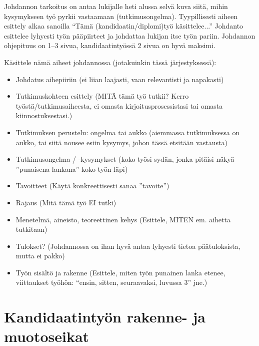 Johdannon tarkoitus on antaa lukijalle heti alussa selvä kuva siitä,
mihin kysymykseen työ pyrkii vastaamaan
(tutkimusongelma). Tyypillisesti aiheen esittely alkaa sanoilla ``Tämä
(kandidaatin/diplomi)työ käsittelee...''  Johdanto esittelee lyhyesti
työn pääpiirteet ja johdattaa lukijan itse työn pariin. Johdannon
ohjepituus on 1--3 sivua, kandidaatintyössä 2 sivua on hyvä maksimi.

Käsittele nämä aiheet johdannossa (jotakuinkin tässä järjestyksessä):
%
\begin{itemize}
 \item Johdatus aihepiiriin 
(ei liian laajasti, vaan relevantisti ja napakasti)
%
 \item Tutkimuskohteen esittely (MITÄ tämä työ tutkii? 
Kerro työstä/tutkimusaiheesta, ei omasta kirjoitusprosessistasi 
tai omasta kiinnostuksestasi.)
%
 \item Tutkimuksen perustelu: ongelma tai aukko 
(aiemmassa tutkimuksessa on aukko, tai siitä nousee esiin 
kysymys, johon tässä etsitään vastausta)
%
 \item Tutkimusongelma / -kysymykset (koko työsi sydän, 
jonka pitäisi näkyä ''punaisena lankana'' koko työn läpi)
 \item Tavoitteet (Käytä konkreettisesti sanaa ''tavoite'')
 \item Rajaus (Mitä tämä työ EI tutki)
 \item Menetelmä, aineisto, teoreettinen kehys (Esittele, 
MITEN em. aihetta tutkitaan)
 \item Tulokset? (Johdannossa on ihan hyvä antaa lyhyesti 
tietoa päätuloksista, mutta ei pakko)
 \item Työn sisältö ja rakenne (Esittele, miten työn punainen 
lanka etenee, viittaukset työhön: 
``ensin, sitten, seuraavaksi, luvussa 3'' jne.)
\end{itemize}



\section{Kandidaatintyön rakenne- ja muotoseikat}
\label{sec:esimluku}

